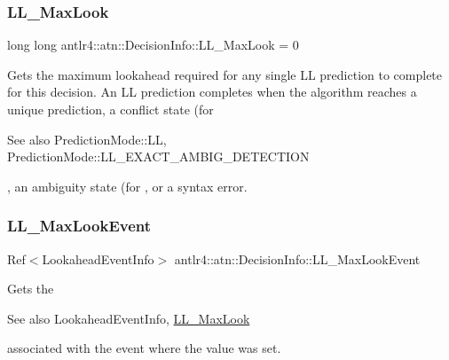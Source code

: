 \subsubsection{\texorpdfstring{L\+L\+\_\+\+Max\+Look}{LL\_MaxLook}}
{\footnotesize\ttfamily long long antlr4\+::atn\+::\+Decision\+Info\+::\+L\+L\+\_\+\+Max\+Look = 0}



Gets the maximum lookahead required for any single LL prediction to complete for this decision. An LL prediction completes when the algorithm reaches a unique prediction, a conflict state (for \begin{DoxySeeAlso}{See also}
Prediction\+Mode\+::\+LL, Prediction\+Mode\+::\+L\+L\+\_\+\+E\+X\+A\+C\+T\+\_\+\+A\+M\+B\+I\+G\+\_\+\+D\+E\+T\+E\+C\+T\+I\+ON


\end{DoxySeeAlso}
, an ambiguity state (for , or a syntax error. 

\mbox{\label{classantlr4_1_1atn_1_1DecisionInfo_a1ddd46ba432cca67892ebbf1263cef6d}} 
\subsubsection{\texorpdfstring{L\+L\+\_\+\+Max\+Look\+Event}{LL\_MaxLookEvent}}
{\footnotesize\ttfamily Ref$<$Lookahead\+Event\+Info$>$ antlr4\+::atn\+::\+Decision\+Info\+::\+L\+L\+\_\+\+Max\+Look\+Event}



Gets the \begin{DoxySeeAlso}{See also}
Lookahead\+Event\+Info, \hyperlink{classantlr4_1_1atn_1_1DecisionInfo_a38f6ee6c6bbed06adae2df60f11dd705}{L\+L\+\_\+\+Max\+Look}


\end{DoxySeeAlso}
associated with the event where the  value was set. 

\mbox{\label{classantlr4_1_1atn_1_1DecisionInfo_a98a55749390e7acf3db64bef3fed7e90}} 

